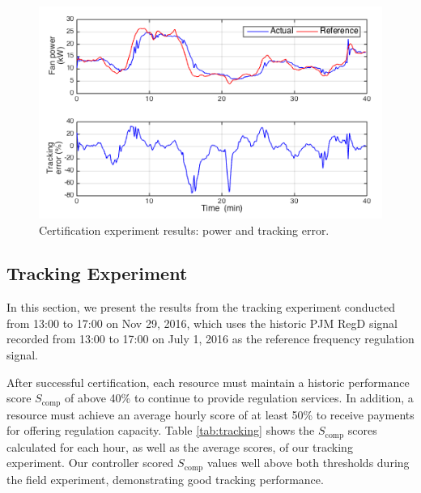 \begin{figure}[t]
\centering
\includegraphics[scale=0.45]{chapters/building_exp/figures/Cert_power.png}
\caption{Certification experiment results: power and tracking error.}
\label{fig:cert_power}
\end{figure}



\subsection{Tracking Experiment}\label{sec:tracking_exp}
In this section, we present the results from the tracking experiment conducted from 13:00 to 17:00 on Nov 29, 2016, which uses the historic PJM RegD signal recorded from 13:00 to 17:00 on July 1, 2016 \cite{PJM_signal_price} as the reference frequency regulation signal.

After successful certification, each resource must maintain a historic performance score $S_\text{comp}$ of above 40\% to continue to provide regulation services. In addition, a resource must achieve an average hourly score of at least 50\% to receive payments for offering regulation capacity. 
Table \ref{tab:tracking} shows the $S_\text{comp}$ scores calculated for each hour, as well as the average scores, of our tracking experiment.
Our controller scored $S_\text{comp}$ values well above both thresholds during the field experiment, demonstrating good tracking performance. 


